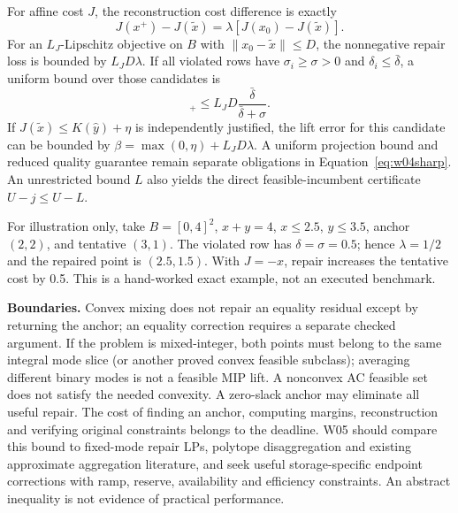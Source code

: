 \documentclass[11pt,letterpaper]{article}
\begin{document}
For affine cost $J$, the reconstruction cost difference is exactly
\[
 J(x^+)-J(\tilde x)=\lambda[J(x_0)-J(\tilde x)].
\]
For an $L_J$-Lipschitz objective on $B$ with $\|x_0-\tilde x\|\le D$, the nonnegative repair loss is bounded by $L_JD\lambda$. If all violated rows have $\sigma_i\ge\sigma>0$ and $\delta_i\le\bar\delta$, a uniform bound over those candidates is
\begin{equation}
 [J(x^+)-J(\tilde x)]_+\le L_JD\frac{\bar\delta}{\bar\delta+\sigma}.
 \label{eq:repairbound}
\end{equation}
If $J(\tilde x)\le K(\hat y)+\eta$ is independently justified, the lift error for this candidate can be bounded by $\beta=\max(0,\eta)+L_JD\lambda$. A uniform projection bound and reduced quality guarantee remain separate obligations in Equation~\ref{eq:w04sharp}. An unrestricted bound $L$ also yields the direct feasible-incumbent certificate $U-j\le U-L$.

For illustration only, take $B=[0,4]^2$, $x+y=4$, $x\le2.5$, $y\le3.5$, anchor $(2,2)$, and tentative $(3,1)$. The violated row has $\delta=\sigma=0.5$; hence $\lambda=1/2$ and the repaired point is $(2.5,1.5)$. With $J=-x$, repair increases the tentative cost by 0.5. This is a hand-worked exact example, not an executed benchmark.

\textbf{Boundaries.} Convex mixing does not repair an equality residual except by returning the anchor; an equality correction requires a separate checked argument. If the problem is mixed-integer, both points must belong to the same integral mode slice (or another proved convex feasible subclass); averaging different binary modes is not a feasible MIP lift. A nonconvex AC feasible set does not satisfy the needed convexity. A zero-slack anchor may eliminate all useful repair. The cost of finding an anchor, computing margins, reconstruction and verifying original constraints belongs to the deadline. W05 should compare this bound to fixed-mode repair LPs, polytope disaggregation and existing approximate aggregation literature, and seek useful storage-specific endpoint corrections with ramp, reserve, availability and efficiency constraints. An abstract inequality is not evidence of practical performance.
\end{document}
